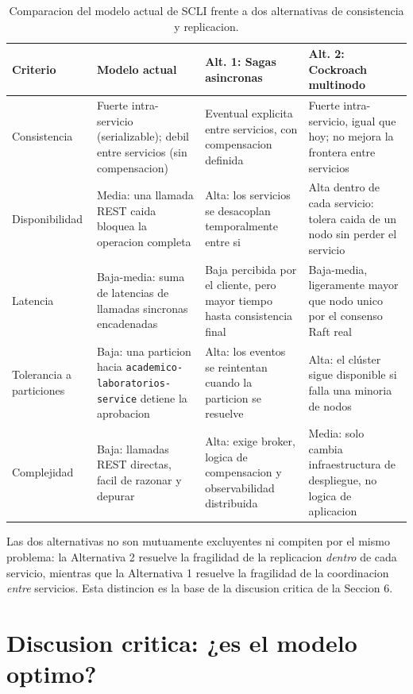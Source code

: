 \documentclass[11pt,a4paper]{article}
\begin{document}
\begin{table}[htbp]
\centering
\small
\caption{Comparacion del modelo actual de SCLI frente a dos alternativas de consistencia y replicacion.}
\label{tab:comparacion}
\begin{tabular}{@{}p{2.6cm}p{3.1cm}p{3.6cm}p{3.6cm}@{}}
\toprule
\textbf{Criterio} & \textbf{Modelo actual} & \textbf{Alt. 1: Sagas asincronas} & \textbf{Alt. 2: Cockroach multinodo} \\
\midrule
Consistencia & Fuerte intra-servicio (serializable); debil entre servicios (sin compensacion) & Eventual explicita entre servicios, con compensacion definida & Fuerte intra-servicio, igual que hoy; no mejora la frontera entre servicios \\
\addlinespace
Disponibilidad & Media: una llamada REST caida bloquea la operacion completa & Alta: los servicios se desacoplan temporalmente entre si & Alta dentro de cada servicio: tolera caida de un nodo sin perder el servicio \\
\addlinespace
Latencia & Baja-media: suma de latencias de llamadas sincronas encadenadas & Baja percibida por el cliente, pero mayor tiempo hasta consistencia final & Baja-media, ligeramente mayor que nodo unico por el consenso Raft real \\
\addlinespace
Tolerancia a particiones & Baja: una particion hacia \texttt{academico-laboratorios-service} detiene la aprobacion & Alta: los eventos se reintentan cuando la particion se resuelve & Alta: el clúster sigue disponible si falla una minoria de nodos \\
\addlinespace
Complejidad & Baja: llamadas REST directas, facil de razonar y depurar & Alta: exige broker, logica de compensacion y observabilidad distribuida & Media: solo cambia infraestructura de despliegue, no logica de aplicacion \\
\bottomrule
\end{tabular}
\end{table}

Las dos alternativas no son mutuamente excluyentes ni compiten por el mismo problema: la Alternativa 2 resuelve la fragilidad de la replicacion \emph{dentro} de cada servicio, mientras que la Alternativa 1 resuelve la fragilidad de la coordinacion \emph{entre} servicios. Esta distincion es la base de la discusion critica de la Seccion 6.

\section{Discusion critica: ¿es el modelo optimo?}
\end{document}
